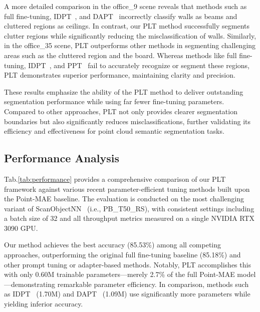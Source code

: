 A more detailed comparison in the office\_9 scene reveals that methods such as full fine-tuning, IDPT~\cite{zha2023instance}, and DAPT~\cite{zhou2024dynamic} incorrectly classify walls as beams and cluttered regions as ceilings. In contrast, our PLT method successfully segments clutter regions while significantly reducing the misclassification of walls. Similarly, in the office\_35 scene, PLT outperforms other methods in segmenting challenging areas such as the cluttered region and the board. Whereas methods like full fine-tuning, IDPT~\cite{zha2023instance}, and PPT~\cite{zhang2024positional} fail to accurately recognize or segment these regions, PLT demonstrates superior performance, maintaining clarity and precision.

These results emphasize the ability of the PLT method to deliver outstanding segmentation performance while using far fewer fine-tuning parameters. Compared to other approaches, PLT not only provides clearer segmentation boundaries but also significantly reduces misclassifications, further validating its efficiency and effectiveness for point cloud semantic segmentation tasks.




\subsection{Performance Analysis}

Tab.\ref{tab:performance} provides a comprehensive comparison of our PLT framework against various recent parameter-efficient tuning methods built upon the Point-MAE\cite{pang2022masked} baseline. The evaluation is conducted on the most challenging variant of ScanObjectNN~\cite{uy2019revisiting} (i.e., PB\_T50\_RS), with consistent settings including a batch size of 32 and all throughput metrics measured on a single NVIDIA RTX 3090 GPU.

Our method achieves the best accuracy (85.53\%) among all competing approaches, outperforming the original full fine-tuning baseline (85.18\%) and other prompt tuning or adapter-based methods. Notably, PLT accomplishes this with only 0.60M trainable parameters—merely 2.7\% of the full Point-MAE model—demonstrating remarkable parameter efficiency. In comparison, methods such as IDPT~\cite{zha2023instance} (1.70M) and DAPT~\cite{zhou2024dynamic} (1.09M) use significantly more parameters while yielding inferior accuracy.

